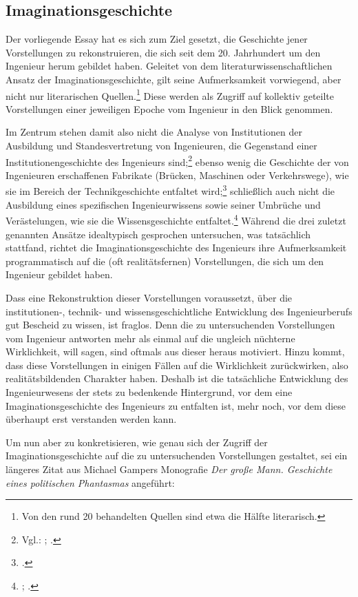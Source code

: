 \documentclass[%
	fontsize=10pt,%
	twoside,%
	headings=optiontoheadandtoc,%
	showtrims]{scrbook}
\renewenvironment{quote}{%
  \addmargin[\genericindent]{0pt}%
  \KOMAoptions{parskip=true}%
  \ifdim\parskip>0pt\else\addvspace{\intextsep}\fi
}{%
  \par
  \endaddmargin\vspace{\intextsep}
}
\begin{document}
\subsection[Imaginationsgeschichte]{Imaginationsgeschichte}
\par Der vorliegende Essay hat es sich zum Ziel gesetzt, die Geschichte jener Vorstellungen zu rekonstruieren, die sich seit dem 20. Jahrhundert um den Ingenieur herum gebildet haben. Geleitet von dem literaturwissenschaftlichen Ansatz der Imaginationsgeschichte, gilt seine Aufmerksamkeit vorwiegend, aber nicht nur literarischen Quellen.\footnote{Von den rund 20 behandelten Quellen sind etwa die Hälfte literarisch.}  Diese werden als Zugriff auf kollektiv ge\-teilte Vorstellungen einer jeweiligen Epoche vom Ingenieur in den Blick genommen.\par Im Zentrum stehen damit also nicht die Analyse von Institutionen der Ausbildung und Standesvertretung von Ingenieuren, die Gegenstand einer Institu\-tionengeschichte des Ingenieurs sind;\footnote{Vgl.: \cite[][]{hortleder1970a}; \cite[][]{kaiser2006a}.}  ebenso wenig die Geschichte der von Ingenieuren erschaffenen Fabrikate (Brücken, Maschinen oder Verkehrswege), wie sie im Bereich der Technikgeschichte entfaltet wird;\footnote{\cite[][]{hughes1998a}.}  schließlich auch nicht die Ausbildung eines spezifischen Ingenieurwissens sowie seiner Umbrüche und Verästelungen, wie sie die Wissens\-geschichte entfaltet.\footnote{\cite[][]{picon2004a}; \cite[][]{porter1995a}.}  Während die drei zuletzt genannten An\-sätze \textendash{} idealtypisch gesprochen \textendash{} untersuchen, was tatsächlich stattfand, richtet die Imaginationsgeschichte des Ingenieurs ihre Aufmerksamkeit programmatisch auf die (oft realitätsfernen) Vorstellungen, die sich um den Ingenieur gebildet haben.\par Dass eine Rekonstruktion dieser Vorstellungen voraussetzt, über die institutionen-, technik- und wissensgeschichtliche Entwicklung des Ingenieurberufs gut Bescheid zu wissen, ist fraglos. Denn die zu untersuchenden Vorstellungen vom Ingenieur antworten mehr als einmal auf die ungleich nüchterne Wirklichkeit, will sagen, sind oftmals aus dieser heraus motiviert. Hinzu kommt, dass diese Vorstellungen in einigen Fällen auf die Wirklichkeit zurückwirken, also realitätsbildenden Charakter haben. Deshalb ist die tatsächliche Entwicklung des Ingenieurwesens der stets zu bedenkende Hintergrund, vor dem eine Imaginationsgeschichte des Ingenieurs zu entfalten ist, mehr noch, vor dem diese überhaupt erst verstanden werden kann.\par Um nun aber zu konkretisieren, wie genau sich der Zugriff der Imaginationsgeschichte auf die zu untersuchenden Vorstellungen gestaltet, sei ein längeres Zitat aus Michael Gampers Monografie \emph{Der große Mann. Geschichte eines politischen Phantasmas} angeführt:\begin{quote}

\end{quote}
\end{document}

